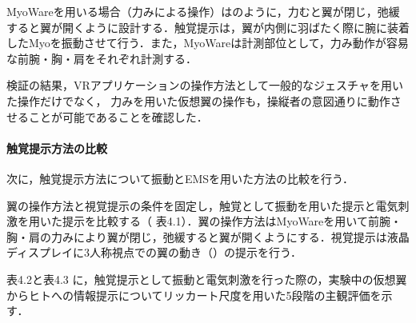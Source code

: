 \begin{small}
      MyoWareを用いる場合（力みによる操作）はのように，力むと翼が閉じ，弛緩すると翼が開くように設計する．触覚提示は，翼が内側に羽ばたく際に腕に装着したMyoを振動させて行う．また，MyoWareは計測部位として，力み動作が容易な前腕・胸・肩をそれぞれ計測する．

      検証の結果，VRアプリケーションの操作方法として一般的なジェスチャを用いた操作だけでなく，
      力みを用いた仮想翼の操作も，操縦者の意図通りに動作させることが可能であることを確認した．

    \paragraph{触覚提示方法の比較} %
      次に，触覚提示方法について振動とEMSを用いた方法の比較を行う．
    
      翼の操作方法と視覚提示の条件を固定し，触覚として振動を用いた提示と電気刺激を用いた提示を比較する（
      表4.1）．翼の操作方法はMyoWareを用いて前腕・胸・肩の力みにより翼が閉じ，弛緩すると翼が開くようにする．視覚提示は液晶ディスプレイに3人称視点での翼の動き（）の提示を行う．

      表4.2と表4.3
      に，触覚提示として振動と電気刺激を行った際の，実験中の仮想翼からヒトへの情報提示についてリッカート尺度を用いた5段階の主観評価を示す．
      
      \begin{table}[tb]
          \begin{center}
              \caption{Results of an experiment using vibration as a haptics presentation}
          \end{center}
      \end{table}
      

\end{small}
